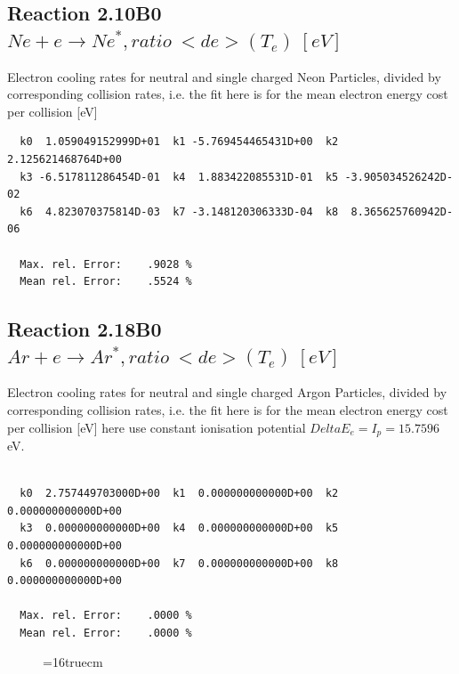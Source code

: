 \documentclass[12pt,dvips]{article}
\begin{document}
\subsection{
Reaction 2.10B0   $  Ne + e \rightarrow Ne^*, ratio \ <de>(T_e) \ [eV] $
}

 Electron cooling rates for neutral and single
 charged Neon Particles, divided by corresponding collision rates, i.e. the fit here is for the mean electron energy cost per collision [eV]

\begin{small}\begin{verbatim}
  k0  1.059049152999D+01  k1 -5.769454465431D+00  k2  2.125621468764D+00
  k3 -6.517811286454D-01  k4  1.883422085531D-01  k5 -3.905034526242D-02
  k6  4.823070375814D-03  k7 -3.148120306333D-04  k8  8.365625760942D-06

  Max. rel. Error:    .9028 %
  Mean rel. Error:    .5524 %

\end{verbatim}\end{small}


\subsection{
Reaction 2.18B0  $   Ar + e \rightarrow Ar^*, ratio  \ <de>(T_e) \ [eV] $
}

  Electron cooling rates for neutral and single
  charged Argon Particles, divided by corresponding collision rates, i.e. the fit here is for the mean electron energy cost per collision [eV]
  here use constant ionisation potential $Delta E_e = I_p = 15.7596$ eV.


\begin{small}\begin{verbatim}

  k0  2.757449703000D+00  k1  0.000000000000D+00  k2  0.000000000000D+00
  k3  0.000000000000D+00  k4  0.000000000000D+00  k5  0.000000000000D+00
  k6  0.000000000000D+00  k7  0.000000000000D+00  k8  0.000000000000D+00

  Max. rel. Error:    .0000 %
  Mean rel. Error:    .0000 %

\end{verbatim}\end{small}

\begin{figure} \label{2.18ll}
\epsfxsize=16truecm
\end{figure}
\newpage
\end{document}
